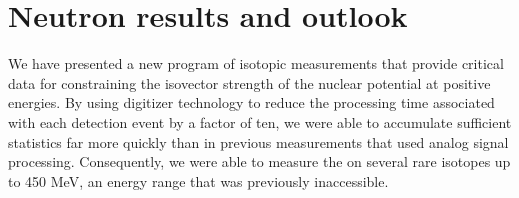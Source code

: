 \section{Neutron \tot results and outlook}
We have presented a new program of isotopic \tot measurements that provide critical data for
constraining the isovector strength of the nuclear potential at positive energies. By using
digitizer technology to reduce the processing time associated with each detection event by a factor
of ten, we were able to accumulate sufficient statistics far more quickly than in previous
measurements that used analog signal processing. Consequently, we were able to measure the \tot on
several rare isotopes up to 450 MeV, an energy range that was previously inaccessible.



